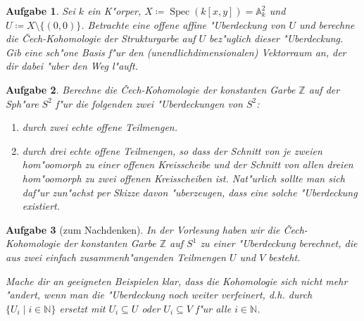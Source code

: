 \documentclass[paper = A4, fontsize=12pt, numbers=noendperiod, chapterprefix=true]{scrbook}
\theoremstyle{break}
\newtheorem{Aufg}{Aufgabe}
\theoremstyle{nonumberbreak}
\theoremstyle{nonumberplain}
\DeclareMathOperator{\Spec}{Spec}
\newcommand{\A}{\mathbb{A}}
\newcommand{\N}{\mathbb{N}}
\newcommand{\Z}{\mathbb{Z}}
\begin{document}
\begin{Aufg}
Sei $k$ ein K"orper, $X \coloneqq \Spec(k[x,y]) = \A^2_k$ und $U \coloneqq X \setminus \{(0,0)\}$. 
Betrachte eine offene affine "Uberdeckung von $U$ und berechne die \v{C}ech-Kohomologie der Strukturgarbe auf $U$ bez"uglich dieser "Uberdeckung. Gib eine sch"one Basis f"ur den (unendlichdimensionalen) Vektorraum an, der dir dabei "uber den Weg l"auft.
\end{Aufg}

\begin{Aufg}
Berechne die \v{C}ech-Kohomologie der konstanten Garbe $\Z$ auf der Sph"are $S^2$ f"ur die folgenden zwei "Uberdeckungen von $S^2$:
\begin{enumerate}%
 \item durch zwei echte offene Teilmengen.
 \item durch drei echte offene Teilmengen, so dass der Schnitt von je zweien hom"oomorph zu einer offenen Kreisscheibe und der Schnitt von allen dreien hom"oomorph zu zwei offenen Kreisscheiben ist. Nat"urlich sollte man sich daf"ur zun"achst per Skizze davon "uberzeugen, dass eine solche "Uberdeckung existiert.
\end{enumerate}
\end{Aufg}

\begin{Aufg}[zum Nachdenken]
In der Vorlesung haben wir die \v{C}ech-Kohomologie der konstanten Garbe $\Z$ auf $S^1$ zu einer "Uberdeckung berechnet, die aus zwei einfach zusammenh"angenden Teilmengen $U$ und $V$ besteht.

Mache dir an geeigneten Beispielen klar, dass die Kohomologie sich nicht mehr "andert, wenn man die "Uberdeckung noch weiter verfeinert, d.h. durch $\{U_i \mid i \in \N\}$ ersetzt mit $U_i \subseteq U$ oder $U_i \subseteq V$ f"ur alle $i \in \N$.
\end{Aufg}





\def\indexspace{\par\medskip}
\end{document}

